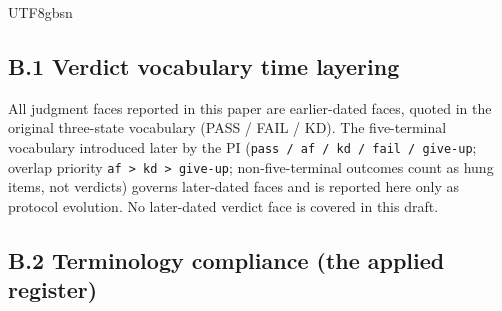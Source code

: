 \documentclass[11pt,letterpaper]{article}
\begin{document}
\begin{CJK}{UTF8}{gbsn}
\subsection*{B.1 Verdict vocabulary time layering}

All judgment faces reported in this paper are earlier-dated faces, quoted in the original three-state vocabulary (PASS / FAIL / KD). The five-terminal vocabulary introduced later by the PI (\texttt{pass / af / kd / fail / give-up}; overlap priority \texttt{af > kd > give-up}; non-five-terminal outcomes count as hung items, not verdicts) governs later-dated faces and is reported here only as protocol evolution. No later-dated verdict face is covered in this draft.

\subsection*{B.2 Terminology compliance (the applied register)}


\end{CJK}
\end{document}
